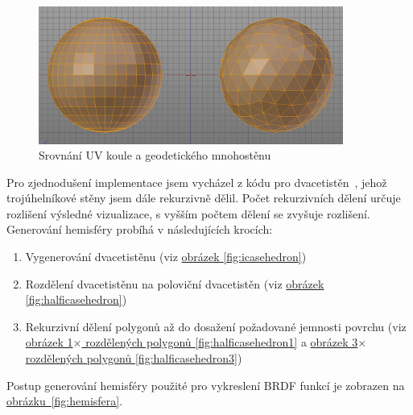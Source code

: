 \documentclass[czech,master]{diploma}
\begin{document}
\begin{figure}[ht]
  \centering
  \includegraphics[width=10cm]{Figures/IcosphereUVSphereComparison.png}
  \caption{Srovnání UV koule a geodetického mnohostěnu~\cite{tan_2019}}
  \label{fig:spheresComparison}
\end{figure}
Pro zjednodušení implementace jsem vycházel z kódu pro dvacetistěn~\cite{OpenGLSphere}, jehož trojúhelníkové stěny jsem dále rekurzivně dělil. Počet rekurzivních dělení určuje rozlišení výsledné vizualizace, s vyšším počtem dělení se zvyšuje rozlišení.
Generování hemisféry probíhá v následujících krocích:
\begin{enumerate}
  \item Vygenerování dvacetistěnu (viz \hyperref[fig:icasehedron]{obrázek \ref{fig:icasehedron}})
  \item Rozdělení dvacetistěnu na poloviční dvacetistěn (viz \hyperref[fig:halficasehedron]{obrázek \ref{fig:halficasehedron}})
  \item Rekurzivní dělení polygonů až do dosažení požadované jemnosti povrchu (viz \hyperref[fig:halficasehedron1]{obrázek 1\(\times\) rozdělených polygonů \ref{fig:halficasehedron1}} a \hyperref[fig:halficasehedron3]{obrázek  3\(\times\) rozdělených polygonů \ref{fig:halficasehedron3}})
\end{enumerate}
Postup generování hemisféry použité pro vykreslení BRDF funkcí je zobrazen na \hyperref[fig:hemisfera]{obrázku~\ref{fig:hemisfera}}.\par
\end{document}

